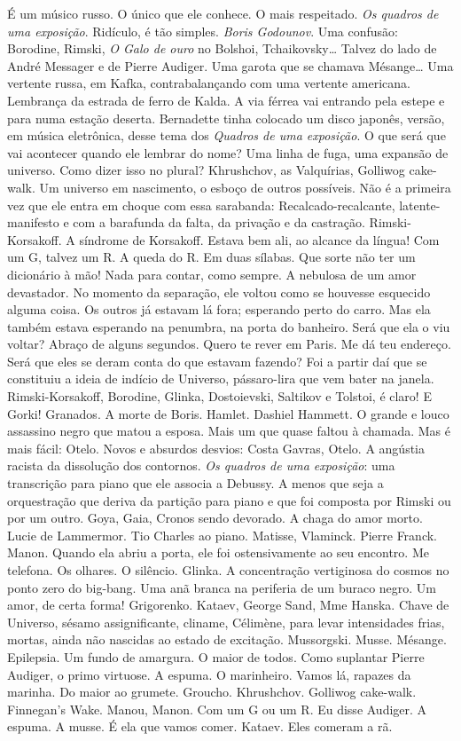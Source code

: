 É um músico russo. O único que ele conhece. O mais respeitado. \emph{Os
quadros de uma exposição}. Ridículo, é tão simples. \emph{Boris
Godounov}. Uma confusão: Borodine, Rimski, \emph{O Galo de ouro} no
Bolshoi, Tchaikovsky\ldots{} Talvez do lado de André Messager e de Pierre
Audiger. Uma garota que se chamava Mésange\ldots{} Uma vertente russa, em
Kafka, contrabalançando com uma vertente americana. Lembrança da estrada
de ferro de Kalda. A via férrea vai entrando pela estepe e para numa
estação deserta. Bernadette tinha colocado um disco japonês, versão, em
música eletrônica, desse tema dos \emph{Quadros de uma exposição}. O que
será que vai acontecer quando ele lembrar do nome? Uma linha de fuga,
uma expansão de universo. Como dizer isso no plural? Khrushchov, as
Valquírias, Golliwog cake-walk. Um universo em nascimento, o esboço de
outros possíveis. Não é a primeira vez que ele entra em choque com essa
sarabanda: Recalcado-recalcante, latente-manifesto e com a barafunda da
falta, da privação e da castração. Rimski-Korsakoff. A síndrome de
Korsakoff. Estava bem ali, ao alcance da língua! Com um G, talvez um R.
A queda do R. Em duas sílabas. Que sorte não ter um dicionário à mão!
Nada para contar, como sempre. A nebulosa de um amor devastador. No
momento da separação, ele voltou como se houvesse esquecido alguma
coisa. Os outros já estavam lá fora; esperando perto do carro. Mas ela
também estava esperando na penumbra, na porta do banheiro. Será que ela
o viu voltar? Abraço de alguns segundos. Quero te rever em Paris. Me dá
teu endereço. Será que eles se deram conta do que estavam fazendo? Foi a
partir daí que se constituiu a ideia de indício de Universo,
pássaro-lira que vem bater na janela. Rimski-Korsakoff, Borodine,
Glinka, Dostoievski, Saltikov e Tolstoi, é claro! E Gorki! Granados. A
morte de Boris. Hamlet. Dashiel Hammett. O grande e louco assassino
negro que matou a esposa. Mais um que quase faltou à chamada. Mas é mais
fácil: Otelo. Novos e absurdos desvios: Costa Gavras, Otelo. A angústia
racista da dissolução dos contornos. \emph{Os quadros de uma exposição}:
uma transcrição para piano que ele associa a Debussy. A menos que seja a
orquestração que deriva da partição para piano e que foi composta por
Rimski ou por um outro. Goya, Gaia, Cronos sendo devorado. A chaga do
amor morto. Lucie de Lammermor. Tio Charles ao piano. Matisse, Vlaminck.
Pierre Franck. Manon. Quando ela abriu a porta, ele foi ostensivamente
ao seu encontro. Me telefona. Os olhares. O silêncio. Glinka. A
concentração vertiginosa do cosmos no ponto zero do big-bang. Uma anã
branca na periferia de um buraco negro. Um amor, de certa forma!
Grigorenko. Kataev, George Sand, Mme Hanska. Chave de Universo, sésamo
assignificante, cliname, Célimène, para levar intensidades frias,
mortas, ainda não nascidas ao estado de excitação. Mussorgski. Musse.
Mésange. Epilepsia. Um fundo de amargura. O maior de todos. Como
suplantar Pierre Audiger, o primo virtuose. A espuma. O marinheiro.
Vamos lá, rapazes da marinha. Do maior ao grumete. Groucho. Khrushchov.
Golliwog cake-walk. Finnegan's Wake. Manou, Manon. Com um G ou um R. Eu
disse Audiger. A espuma. A musse. É ela que vamos comer. Kataev. Eles
comeram a rã.

